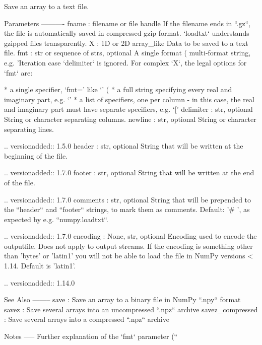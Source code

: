 \begin{DoxyVerb}Save an array to a text file.

Parameters
----------
fname : filename or file handle
    If the filename ends in ``.gz``, the file is automatically saved in
    compressed gzip format.  `loadtxt` understands gzipped files
    transparently.
X : 1D or 2D array_like
    Data to be saved to a text file.
fmt : str or sequence of strs, optional
    A single format (%
    multi-format string, e.g. 'Iteration %
    case `delimiter` is ignored. For complex `X`, the legal options
    for `fmt` are:

    * a single specifier, `fmt='%
      like `' (%
    * a full string specifying every real and imaginary part, e.g.
      `' %
    * a list of specifiers, one per column - in this case, the real
      and imaginary part must have separate specifiers,
      e.g. `['%
delimiter : str, optional
    String or character separating columns.
newline : str, optional
    String or character separating lines.

    .. versionadded:: 1.5.0
header : str, optional
    String that will be written at the beginning of the file.

    .. versionadded:: 1.7.0
footer : str, optional
    String that will be written at the end of the file.

    .. versionadded:: 1.7.0
comments : str, optional
    String that will be prepended to the ``header`` and ``footer`` strings,
    to mark them as comments. Default: '# ',  as expected by e.g.
    ``numpy.loadtxt``.

    .. versionadded:: 1.7.0
encoding : {None, str}, optional
    Encoding used to encode the outputfile. Does not apply to output
    streams. If the encoding is something other than 'bytes' or 'latin1'
    you will not be able to load the file in NumPy versions < 1.14. Default
    is 'latin1'.

    .. versionadded:: 1.14.0


See Also
--------
save : Save an array to a binary file in NumPy ``.npy`` format
savez : Save several arrays into an uncompressed ``.npz`` archive
savez_compressed : Save several arrays into a compressed ``.npz`` archive

Notes
-----
Further explanation of the `fmt` parameter
(``%


\end{DoxyVerb}
